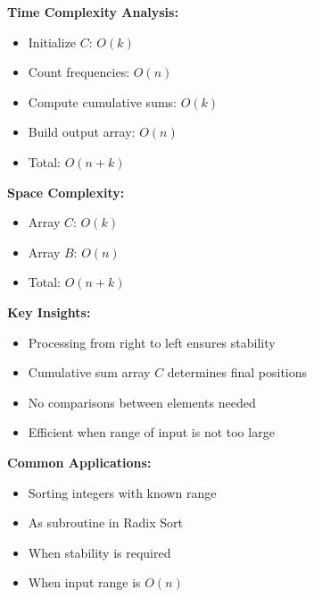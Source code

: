 \textbf{Time Complexity Analysis:}
\begin{itemize}[noitemsep]
    \item Initialize $C$: $O(k)$
    \item Count frequencies: $O(n)$
    \item Compute cumulative sums: $O(k)$
    \item Build output array: $O(n)$
    \item Total: $O(n + k)$
\end{itemize}

\textbf{Space Complexity:}
\begin{itemize}[noitemsep]
    \item Array $C$: $O(k)$
    \item Array $B$: $O(n)$
    \item Total: $O(n + k)$
\end{itemize}

\textbf{Key Insights:}
\begin{itemize}[noitemsep]
    \item Processing from right to left ensures stability
    \item Cumulative sum array $C$ determines final positions
    \item No comparisons between elements needed
    \item Efficient when range of input is not too large
\end{itemize}

\textbf{Common Applications:}
\begin{itemize}[noitemsep]
    \item Sorting integers with known range
    \item As subroutine in Radix Sort
    \item When stability is required
    \item When input range is $O(n)$
\end{itemize}
